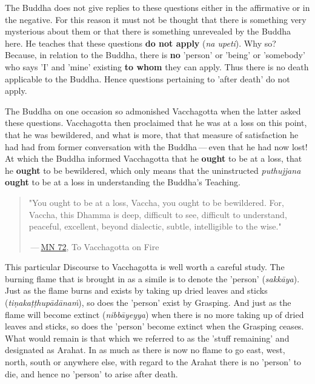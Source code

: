 The Buddha does not give replies to these questions either in the affirmative or in the negative. For this reason it must not be thought that there is something very mysterious about them or that there is something unrevealed by the Buddha here. He teaches that these questions \textbf{do not apply} (\emph{na upeti}). Why so? Because, in relation to the Buddha, there is \textbf{no} 'person' or 'being' or 'somebody' who says 'I' and 'mine' existing \textbf{to whom} they can apply. Thus there is no death applicable to the Buddha. Hence questions pertaining to 'after death' do not apply.

The Buddha on one occasion so admonished Vacchagotta when the latter asked these questions. Vacchagotta then proclaimed that he was at a loss on this point, that he was bewildered, and what is more, that that measure of satisfaction he had had from former conversation with the Buddha --- even that he had now lost! At which the Buddha informed Vacchagotta that he \textbf{ought} to be at a loss, that he \textbf{ought} to be bewildered, which only means that the uninstructed \emph{puthujjana} \textbf{ought} to be at a loss in understanding the Buddha's Teaching.

\begin{quote}
"You ought to be at a loss, Vaccha, you ought to be bewildered. For, Vaccha, this Dhamma is deep, difficult to see, difficult to understand, peaceful, excellent, beyond dialectic, subtle, intelligible to the wise."

 --- \href{https://suttacentral.net/mn72/en/thanissaro}{MN 72}, To Vacchagotta on Fire
\end{quote}

This particular Discourse to Vacchagotta is well worth a careful study. The burning flame that is brought in as a simile is to denote the 'person' (\emph{sakkāya}). Just as the flame burns and exists by taking up dried leaves and sticks (\emph{tiṇakaṭṭhupādānaṁ}), so does the 'person' exist by Grasping. And just as the flame will become extinct (\emph{nibbāyeyya}) when there is no more taking up of dried leaves and sticks, so does the 'person' become extinct when the Grasping ceases. What would remain is that which we referred to as the 'stuff remaining' and designated as Arahat. In as much as there is now no flame to go east, west, north, south or anywhere else, with regard to the Arahat there is no 'person' to die, and hence no 'person' to arise after death.

